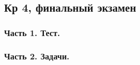 \documentclass[12pt, a4paper]{article}
\theoremstyle{definition}
\begin{document}
\subsection{Кр 4, финальный экзамен}

\subsubsection*{Часть 1. Тест.}






\subsubsection*{Часть 2. Задачи.}
\end{document}
